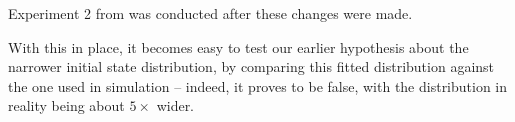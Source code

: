 \documentclass[main.tex]{subfiles}
\begin{document}
	Experiment 2 from \label{fig:learning-compare} was conducted after these changes were made.

	With this in place, it becomes easy to test our earlier hypothesis about the narrower initial state distribution, by comparing this fitted distribution against the one used in simulation -- indeed, it proves to be false, with the distribution in reality being about $5\times$ wider\footnotemark.


\bib
\end{document}
